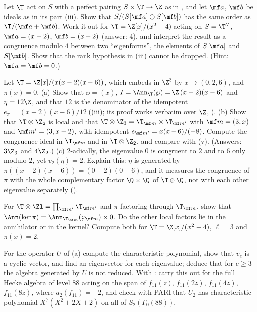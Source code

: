 \begin{exercise}\label{ex:modules:ex-crit}
Let $\T$ act on $S$ with a perfect pairing $S\times\T\to\Z$ as in , and let $\mf a$, $\mf b$ be ideals as in its part (iii). Show that
$S/(S[\mf a]\oplus S[\mf b])$ has the same order as $\T/(\mf a+\mf b)$. Work it out for $\T=\Z[x]/(x^2-4)$ acting on $S=\T^\vee$, $\mf a=(x-2)$, $\mf b=(x+2)$ (answer:
$4$), and interpret the result as a congruence modulo $4$ between two ``eigenforms'', the elements of $S[\mf a]$ and $S[\mf b]$. Show that the rank hypothesis
in (iii) cannot be dropped. (Hint: $\mf a=\mf b=0$.)
\end{exercise}

\begin{exercise}\label{ex:modules:ex-three}
Let $\T=\Z[x]/(x(x-2)(x-6))$, which embeds in $\Z^3$ by $x\mapsto(0,2,6)$, and $\pi(x)=0$.
(a) Show that $\wp=(x)$, $I=\Ann_\T(\wp)=\Z\,(x-2)(x-6)$ and $\eta=12\Z$, and that $12$ is the denominator of the idempotent $e_\pi=(x-2)(x-6)/12$
((iii); its proof works verbatim over $\Z$, ).
(b) Show that $\T\otimes\Z_2$ is local and that $\T\otimes\Z_3=\T_{\mf m}\times\T_{\mf m'}$ with $\mf m=(3,x)$ and $\mf m'=(3,x-2)$, with idempotent
$e_{\mf m'}=x(x-6)/(-8)$. Compute the congruence ideal in $\T_{\mf m}$ and in $\T\otimes\Z_2$, and compare with (v).
(Answers: $3\Z_3$ and $4\Z_2$.)
(c) $2$-adically, the eigenvalue $0$ is congruent to $2$ and to $6$ only modulo $2$, yet $v_2(\eta)=2$. Explain this: $\eta$ is generated by $\pi((x-2)(x-6))=(0-2)(0-6)$, and
it measures the congruence of $\pi$ with the whole complementary factor $\Q\times\Q$ of $\T\otimes\Q$, not with each other eigenvalue separately
().
\end{exercise}

\begin{exercise}\label{ex:modules:ex-tm}
For $\T\otimes\Zl=\prod_{\mf m'}\T_{\mf m'}$ and $\pi$ factoring through $\T_{\mf m}$, show that $\Ann(\ker\pi)=\Ann_{\T_{\mf m}}(\wp_{\mf m})\times0$. Do the other local factors lie in the
annihilator or in the kernel? Compute both for $\T=\Z[x]/(x^2-4)$, $\ell=3$ and $\pi(x)=2$.
\end{exercise}

\begin{exercise}\label{ex:modules:ex-shift}
For the operator $U$ of (a) compute the characteristic polynomial, show that $v_e$ is a cyclic vector, and find an eigenvector for each eigenvalue;
deduce that for $e\ge3$ the algebra generated by $U$ is not reduced. With : carry this out for the full Hecke algebra of level $88$ acting on the span of
$f_{11}(z)$, $f_{11}(2z)$, $f_{11}(4z)$, $f_{11}(8z)$, where $a_2(f_{11})=-2$, and check with PARI that $U_2$ has characteristic polynomial $X^7(X^2+2X+2)$ on all of $S_2(\Gamma_0(88))$.
\end{exercise}

